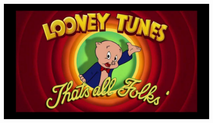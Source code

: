 \documentclass[aspectratio=169]{beamer}
\begin{document}
\begin{figure}
  \includegraphics[width=\paperwidth]{fim.jpg}
\end{figure}
\end{document}
